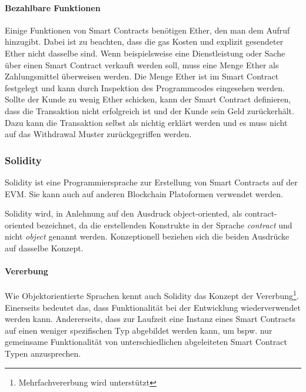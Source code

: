 \paragraph{Bezahlbare Funktionen}
Einige Funktionen von Smart Contracts benötigen Ether, den man dem Aufruf hinzugibt. Dabei ist zu beachten, dass die gas Kosten und explizit gesendeter Ether nicht dasselbe sind. Wenn beispielsweise eine Dienstleistung oder Sache über einen Smart Contract verkauft werden soll, muss eine Menge Ether als Zahlungsmittel überweisen werden. Die Menge Ether ist im Smart Contract festgelegt und kann durch Inspektion des Programmcodes eingesehen werden. Sollte der Kunde zu wenig Ether schicken, kann der Smart Contract definieren, dass die Transaktion nicht erfolgreich ist und der Kunde sein Geld zurückerhält. Dazu kann die Transaktion selbst als nichtig erklärt werden und es muss nicht auf das Withdrawal Muster zurückgegriffen werden.\cite{solidity.readthedocs.io}

\subsubsection{Solidity}
\label{subsubsec:Solidity}
Solidity ist eine Programmiersprache zur Erstellung von Smart Contracts auf der \acrfull{EVM}. Sie kann auch auf anderen Blockchain Platoformen verwendet werden.\cite{cryptocoinnews.com/smart-contract-bitcoin,github.com/hyperledger/burrow}

Solidity wird, in Anlehnung auf den Ausdruck object-oriented, als contract-oriented bezeichnet, da die erstellenden Konstrukte in der Sprache \emph{contract} und nicht \emph{object} genannt werden. Konzeptionell beziehen sich die beiden Ausdrücke auf dasselbe Konzept.

\paragraph{Vererbung}
\label{para:Vererbung}
Wie Objektorientierte Sprachen kennt auch Solidity das Konzept der Vererbung\footnote{Mehrfachvererbung wird unterstützt}. Einerseits bedeutet das, dass Funktionalität bei der Entwicklung wiederverwendet werden kann. Andererseits, dass zur Laufzeit eine Instanz eines Smart Contracts auf einen weniger spezifischen Typ abgebildet werden kann, um bspw. nur gemeinsame Funktionalität von unterschiedlichen abgeleiteten Smart Contract Typen anzusprechen.